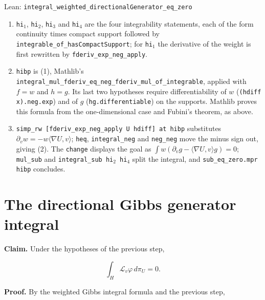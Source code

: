 \documentclass[11pt,a4paper]{article}
\begin{document}
\begin{leanbox}{Lean: \texttt{integral\_\allowbreak{}weighted\_\allowbreak{}directionalGenerator\_\allowbreak{}eq\_\allowbreak{}zero}}
\begin{enumerate}
\item \texttt{hi\ensuremath{{}_{1}}}, \texttt{hi\ensuremath{{}_{2}}}, \texttt{hi\ensuremath{{}_{3}}} and \texttt{hi\ensuremath{{}_{4}}} are the four integrability statements, each of the form continuity times compact support followed by \texttt{integrable\_\allowbreak{}of\_\allowbreak{}has\allowbreak{}Compact\allowbreak{}Support}; for \texttt{hi\ensuremath{{}_{1}}} the derivative of the weight is first rewritten by \texttt{fderiv\_\allowbreak{}exp\_\allowbreak{}neg\_\allowbreak{}apply}.

\item \texttt{hibp} is (1), Mathlib's \texttt{integral\_\allowbreak{}mul\_\allowbreak{}fderiv\_\allowbreak{}eq\_\allowbreak{}neg\_\allowbreak{}fderiv\_\allowbreak{}mul\_\allowbreak{}of\_\allowbreak{}integrable}, applied with \(f=w\) and \(h=g\). Its last two hypotheses require differentiability of \(w\) (\texttt{(hdiff x).\allowbreak{}neg.\allowbreak{}exp}) and of \(g\) (\texttt{hg.\allowbreak{}differentiable}) on the supports. Mathlib proves this formula from the one-dimensional case and Fubini's theorem, as above.

\item \texttt{simp\_\allowbreak{}rw [fderiv\_\allowbreak{}exp\_\allowbreak{}neg\_\allowbreak{}apply U hdiff] at hibp} substitutes \(\partial_vw=-w\langle\nabla U,v\rangle\); \texttt{heq}, \texttt{integral\_\allowbreak{}neg} and \texttt{neg\_\allowbreak{}neg} move the minus sign out, giving (2). The \texttt{change} displays the goal as \(\int w(\partial_vg-\langle\nabla U,v\rangle g)=0\); \texttt{mul\_\allowbreak{}sub} and \texttt{integral\_\allowbreak{}sub hi\ensuremath{{}_{2}} hi\ensuremath{{}_{4}}} split the integral, and \texttt{sub\_\allowbreak{}eq\_\allowbreak{}zero.\allowbreak{}mpr hibp} concludes.

\end{enumerate}
\end{leanbox}

\section{\texorpdfstring{The directional Gibbs generator integral}{The directional Gibbs generator integral}}


\textbf{Claim.} Under the hypotheses of the previous step,


\[\int_H\mathcal L_v\varphi\,d\pi_U=0.\]


\textbf{Proof.} By the weighted Gibbs integral formula and the previous step,
\end{document}
